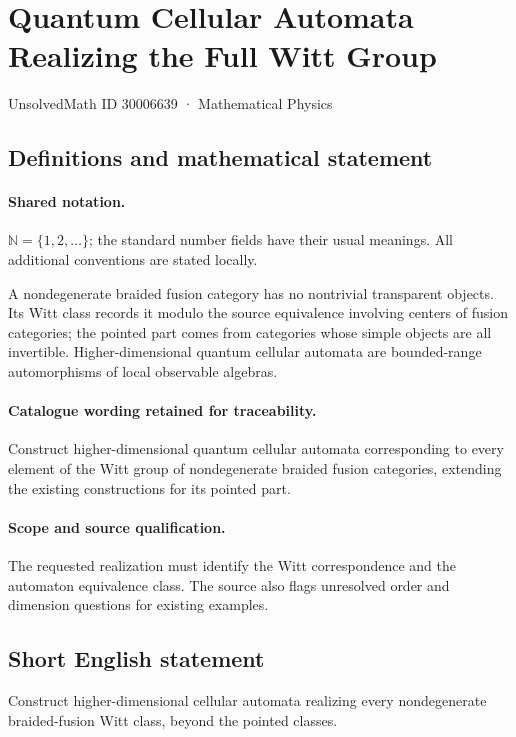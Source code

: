 \documentclass[11pt]{article}
\begin{document}
\setcounter{section}{30006638}
\section{Quantum Cellular Automata Realizing the Full Witt Group}\label{30006639}
{\small UnsolvedMath ID 30006639 · Mathematical Physics}
\subsection{Definitions and mathematical statement}

\paragraph{Shared notation.}$\mathbb N=\{1,2,\ldots\}$; the standard number fields have their usual meanings. All additional conventions are stated locally.


A nondegenerate braided fusion category has no nontrivial transparent objects. Its Witt class records it modulo the source equivalence involving centers of fusion categories; the pointed part comes from categories whose simple objects are all invertible. Higher-dimensional quantum cellular automata are bounded-range automorphisms of local observable algebras.

\paragraph{Catalogue wording retained for traceability.}
Construct higher-dimensional quantum cellular automata corresponding to every element of the Witt group of nondegenerate braided fusion categories, extending the existing constructions for its pointed part.

\paragraph{Scope and source qualification.}The requested realization must identify the Witt correspondence and the automaton equivalence class. The source also flags unresolved order and dimension questions for existing examples.
\subsection{Short English statement}
Construct higher-dimensional cellular automata realizing every nondegenerate braided-fusion Witt class, beyond the pointed classes.
\end{document}
